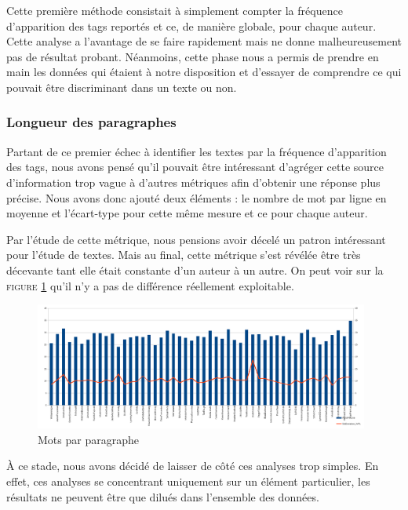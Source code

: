 \documentclass[a4paper,12pt]{report}
\begin{document}
Cette première méthode consistait à simplement compter la fréquence d'apparition des tags reportés et ce, de manière globale, pour chaque auteur. Cette analyse a l'avantage de se faire rapidement mais ne donne malheureusement pas de résultat probant. Néanmoins, cette phase nous a permis de prendre en main les données qui étaient à notre disposition et d'essayer de comprendre ce qui pouvait être discriminant dans un texte ou non.


\subsubsection{Longueur des paragraphes}

Partant de ce premier échec à identifier les textes par la fréquence d'apparition des tags, nous avons pensé qu'il pouvait être intéressant d’agréger cette source d'information trop vague à d'autres métriques afin d'obtenir une réponse plus précise. Nous avons donc ajouté deux éléments : le nombre de mot par ligne en moyenne et l'écart-type pour cette même mesure et ce pour chaque auteur.

Par l'étude de cette métrique, nous pensions avoir décelé un patron intéressant pour l'étude de textes. Mais au final, cette métrique s'est révélée être très décevante tant elle était constante d'un auteur à un autre. On peut voir sur la \textsc{figure \ref{WPL}} qu'il n'y a pas de différence réellement exploitable.
				
\begin{figure}[hbtp]
\centering
\includegraphics[width=11cm]{fig/WPL.png}
\caption{Mots par paragraphe}
\label{WPL}
\end{figure}

À ce stade, nous avons décidé de laisser de côté ces analyses trop simples. En effet, ces analyses se concentrant uniquement sur un élément particulier, les résultats ne peuvent être que dilués dans l'ensemble des données.

\end{document}
